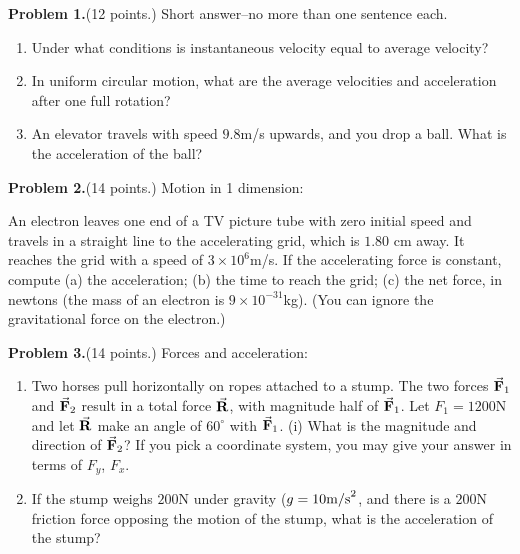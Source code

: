 \documentclass[12pt]{article}
\begin{document}
\bigskip

\bigskip

{\bf Problem 1.}(12 points.) Short answer--no more than one sentence each. 
\begin{enumerate}
\item Under what conditions is instantaneous velocity equal to average velocity?
\bigskip
\bigskip
\bigskip
\bigskip
\bigskip
\item In uniform circular motion, what are the average velocities and acceleration after one full rotation?
\bigskip
\bigskip
\bigskip
\bigskip
\bigskip
\item An elevator travels with speed $9.8$m/s upwards, and you drop a ball. What is the acceleration of the ball?
\bigskip
\bigskip
\bigskip
\bigskip
\bigskip
\end{enumerate}
{\bf Problem 2.}(14 points.) Motion in 1 dimension:

An electron leaves one end of a TV picture tube with zero initial speed and travels in a straight line to the accelerating grid, which is $1.80$ cm away. It reaches the grid with a speed of $3 \times 10^6$m/s. If the accelerating force is constant, compute (a) the acceleration; (b) the time to reach the grid; (c) the net force, in newtons (the mass of an electron is $9 \times 10^{-31}$kg). (You can ignore the gravitational force on the electron.)

\bigskip
\bigskip
\bigskip
\bigskip
\bigskip
\bigskip
\bigskip
\bigskip
\bigskip
\bigskip
\bigskip
\bigskip
\bigskip
\bigskip
\bigskip
\bigskip
\bigskip
\bigskip
\bigskip
\bigskip
\bigskip
\bigskip
\bigskip
\bigskip
\newpage
{\bf Problem 3.}(14 points.) Forces and acceleration:
\begin{enumerate}
\item Two horses pull horizontally on ropes attached to a stump. The two forces $\vec{\bf F}_1$ and $\vec{\bf F}_2$ result in a total force $\vec{\bf R}$, with magnitude half of $\vec{\bf F}_1$. Let $F_1 = 1200$N and let $\vec{\bf R}$ make an angle of $60^\circ$ with $\vec{\bf F}_1$. (i) What is the magnitude and direction of $\vec{\bf F}_2$? If you pick a coordinate system, you may give your answer in terms of $F_y$, $F_x$. 
\bigskip
\bigskip
\bigskip
\bigskip
\bigskip
\bigskip
\bigskip
\bigskip
\bigskip
\bigskip
\bigskip
\bigskip
\bigskip
\bigskip
\bigskip
\item If the stump weighs $200$N under gravity ($g = 10{\rm m/s}^2$, and there is a $200$N friction force opposing the motion of the stump, what is the acceleration of the stump?
\bigskip
\bigskip
\bigskip
\bigskip
\bigskip
\bigskip
\bigskip
\bigskip
\bigskip
\bigskip
\bigskip
\end{enumerate}
\end{document}
